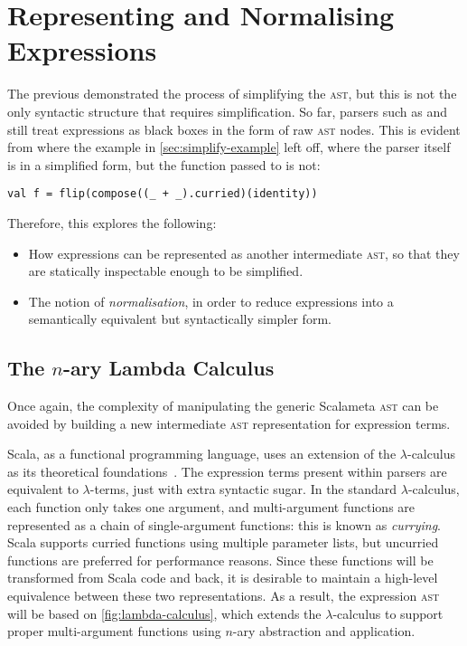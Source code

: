 \documentclass[../../../main.tex]{subfiles}
\begin{document}
\section{Representing and Normalising Expressions}\label{sec:simplify-exprs}

The previous  demonstrated the process of simplifying the  \textsc{ast}, but this is not the only syntactic structure that requires simplification.
So far, parsers such as  and  still treat expressions as black boxes in the form of raw  \textsc{ast} nodes.
This is evident from where the example in \cref{sec:simplify-example} left off, where the parser itself is in a simplified form, but the function passed to  is not:
\begin{verbatim}
val f = flip(compose((_ + _).curried)(identity))
\end{verbatim}
%
Therefore, this  explores the following:
\begin{itemize}
  \item How expressions can be represented as another intermediate \textsc{ast}, so that they are statically inspectable enough to be simplified.
  \item The notion of \emph{normalisation}, in order to reduce expressions into a semantically equivalent but syntactically simpler form.
\end{itemize}

\subsection{The $n$-ary Lambda Calculus}
Once again, the complexity of manipulating the generic Scalameta \textsc{ast} can be avoided by building a new intermediate \textsc{ast} representation for expression terms.

Scala, as a functional programming language, uses an extension of the $\lambda$-calculus~\cite{church_lambda_1936} as its theoretical foundations~\cite{cremet_core_2006,amin_essence_2016}.
The expression terms present within parsers are equivalent to $\lambda$-terms, just with extra syntactic sugar.
In the standard $\lambda$-calculus, each function only takes one argument, and multi-argument functions are represented as a chain of single-argument functions: this is known as \emph{currying}.
Scala supports curried functions using multiple parameter lists, but uncurried functions are preferred for performance reasons.
Since these functions will be transformed from Scala code and back, it is desirable to maintain a high-level equivalence between these two representations.
As a result, the expression \textsc{ast} will be based on \cref{fig:lambda-calculus}, which extends the $\lambda$-calculus to support proper multi-argument functions using $n$-ary abstraction and application.
\end{document}
